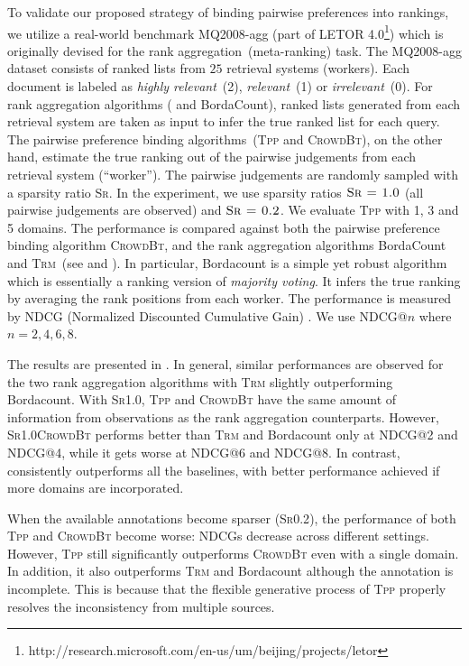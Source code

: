 To validate our proposed strategy of binding pairwise preferences into rankings,
we utilize a real-world benchmark MQ2008-agg (part of LETOR
4.0\footnote{http://research.microsoft.com/en-us/um/beijing/projects/letor})
which is originally devised for the rank aggregation~(meta-ranking) task.  The
MQ2008-agg dataset consists of ranked lists from $25$ retrieval systems
(workers). Each document is labeled as \textit{highly relevant}~(2),
\textit{relevant}~(1) or \textit{irrelevant}~(0).  For rank aggregation
algorithms (\trm{} and BordaCount), ranked lists generated from each retrieval
system are taken as input to infer the true ranked list for each query. The
pairwise preference binding algorithms~(\textsc{Tpp} and \textsc{CrowdBt}), on
the other hand, estimate the true ranking out of the pairwise judgements from
each retrieval system (``worker''). The pairwise judgements are randomly sampled
with a sparsity ratio \textsc{Sr}.  In the experiment, we use sparsity ratios
$\textsc{Sr = 1.0}$ (all pairwise judgements are observed) and $\textsc{Sr =
0.2}$.  We evaluate \textsc{Tpp} with 1, 3 and 5 domains. The performance is
compared against both the pairwise preference binding algorithm
\textsc{CrowdBt}, and the rank aggregation algorithms
BordaCount~\cite{aslam2001models} and \textsc{Trm}~(see
 and ). In particular,
Bordacount is a simple yet robust algorithm which is essentially a ranking
version of \emph{majority voting}. It infers the true ranking by averaging the
rank positions from each worker.  The performance is measured by NDCG
(Normalized Discounted Cumulative Gain) \cite{jarvelin2000ir}. We use NDCG@$n$
where $n = 2, 4, 6, 8$.

The results are presented in . In general,
similar performances are observed for the two rank aggregation algorithms with
\textsc{Trm} slightly outperforming Bordacount. With \textsc{Sr1.0},
\textsc{Tpp} and \textsc{CrowdBt} have the same amount of information from
observations as the rank aggregation counterparts. However,
\textsc{Sr1.0CrowdBt} performs better than \textsc{Trm} and Bordacount only at
NDCG@2 and NDCG@4, while it gets worse at NDCG@6 and NDCG@8. In contrast, \tpp{}
consistently outperforms all the baselines, with better performance achieved if
more domains are incorporated.

When the available  annotations become sparser (\textsc{Sr0.2}), the performance
of both \textsc{Tpp} and \textsc{CrowdBt} become worse: NDCGs decrease across
different settings. However, \textsc{Tpp} still significantly outperforms
\textsc{CrowdBt} even with a single domain. In addition, it also outperforms
\textsc{Trm} and Bordacount although the annotation is incomplete. This is
because that the flexible generative process of \textsc{Tpp} properly resolves
the inconsistency from multiple sources.

